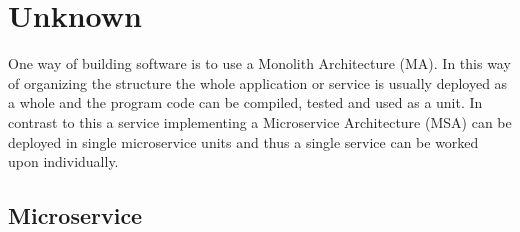 \section{Unknown}

One way of building software is to use a Monolith Architecture (MA).
In this way of organizing the structure the whole application or service 
is usually deployed as a whole and the program code can be compiled, tested and
used as a unit. In contrast to this a service implementing a Microservice 
Architecture (MSA) can be deployed in single microservice units and thus a single service 
can be worked upon individually.





\begin{sloppypar}

\end{sloppypar}

\subsection{Microservice}






